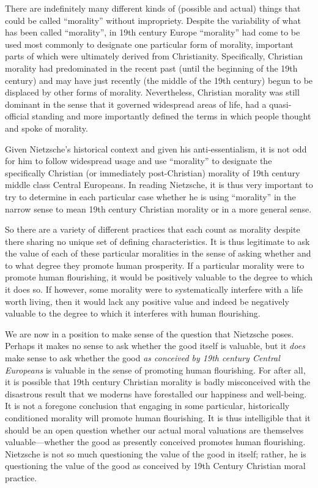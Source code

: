 There are indefinitely many different kinds of (possible and actual) things that could be called ``morality'' without impropriety. Despite the variability of what has been called ``morality'', in 19th century Europe ``morality'' had come to be used most commonly to designate one particular form of morality, important parts of which were ultimately derived from Christianity. Specifically, Christian morality had predominated in the recent past (until the beginning of the 19th century) and may have just recently (the middle of the 19th century) begun to be displaced by other forms of morality. Nevertheless, Christian morality was still dominant in the sense that it governed widespread areas of life, had a quasi-official standing and more importantly defined the terms in which people thought and spoke of morality.

Given Nietzsche's historical context and given his anti-essentialism, it is not odd for him to follow widespread usage and use ``morality'' to designate the specifically Christian (or immediately post-Christian) morality of 19th century middle class Central Europeans. In reading Nietzsche, it is thus very important to try to determine in each particular case whether he is using ``morality'' in the narrow sense to mean 19th century Christian morality or in a more general sense.

So there are a variety of different practices that each count as morality despite there sharing no unique set of defining characteristics. It is thus legitimate to ask the value of each of these particular moralities in the sense of asking whether and to what degree they promote human prosperity. If a particular morality were to promote human flourishing, it would be positively valuable to the degree to which it does so. If however, some morality were to systematically interfere with a life worth living, then it would lack any positive value and indeed be negatively valuable to the degree to which it interferes with human flourishing.

We are now in a position to make sense of the question that Nietzsche poses. Perhaps it makes no sense to ask whether the good itself is valuable, but it \emph{does} make sense to ask whether the good \emph{as conceived by 19th century Central Europeans} is valuable in the sense of promoting human flourishing. For after all, it is possible that 19th century Christian morality is badly misconceived with the disastrous result that we moderns have forestalled our happiness and well-being. It is not a foregone conclusion that engaging in some particular, historically conditioned morality will promote human flourishing. It is thus intelligible that it should be an open question whether our actual moral valuations are themselves valuable---whether the good as presently conceived promotes human flourishing. Nietzsche is not so much questioning the value of the good in itself; rather, he is questioning the value of the good as conceived by 19th Century Christian moral practice.

